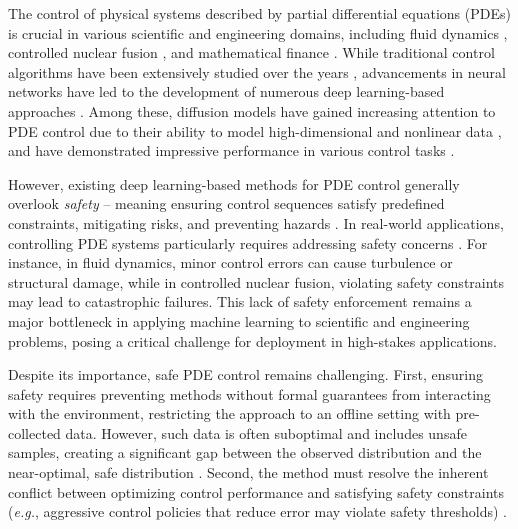 
The control of physical systems described by partial differential equations (PDEs) is crucial in various scientific and engineering domains, including fluid dynamics \citep{hinze2001second}, controlled nuclear fusion \citep{schuster2006role}, and mathematical finance \citep{soner2004stochastic}. While traditional control algorithms have been extensively studied over the years \citep{1580152, protas2008adjoint}, advancements in neural networks have led to the development of numerous deep learning-based approaches \citep{farahmand2017deep, holl2020learning, hwang2022solving}. Among these, diffusion models have gained increasing attention to PDE control due to their ability to model high-dimensional and nonlinear data \citep{vahdat2022lion, li2024synthetic}, and have demonstrated impressive performance in various control tasks \citep{chi2023diffusion, wei2024generative, hu2024wavelet}.

However, existing deep learning-based methods for PDE control generally overlook \textit{safety} -- meaning ensuring control sequences satisfy predefined constraints, mitigating risks, and preventing hazards \citep{dawson2022safe, liu2023datasets}. In real-world applications, controlling PDE systems particularly requires addressing safety concerns \citep{735940, argomedo2013lyapunov}. For instance, in fluid dynamics, minor control errors can cause turbulence or structural damage, while in controlled nuclear fusion, violating safety constraints may lead to catastrophic failures. This lack of safety enforcement remains a major bottleneck in applying machine learning to scientific and engineering problems, posing a critical challenge for deployment in high-stakes applications.

Despite its importance, safe PDE control remains challenging. First, ensuring safety requires preventing methods without formal guarantees from interacting with the environment, restricting the approach to an offline setting with pre-collected data. However, such data is often suboptimal and includes unsafe samples, creating a significant gap between the observed distribution and the near-optimal, safe distribution \citep{xu2022constraints, liu2023datasets}. 
Second, the method must resolve the inherent conflict between optimizing control performance and satisfying safety constraints (\emph{e.g.}, aggressive control policies that reduce error may violate safety thresholds) \citep{liu2023datasets, zheng2024safe}.

